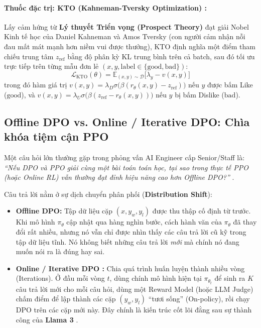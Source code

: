 \paragraph{Thuốc đặc trị: KTO (Kahneman-Tversky Optimization) \citep{ethayarajh2024kto}:}
Lấy cảm hứng từ \textbf{Lý thuyết Triển vọng (Prospect Theory)} đạt giải Nobel Kinh tế học của Daniel Kahneman và Amos Tversky (con người cảm nhận nỗi đau mất mát mạnh hơn niềm vui được thưởng), KTO định nghĩa một điểm tham chiếu trung tâm $z_{\text{ref}}$ bằng độ phân kỳ KL trung bình trên cả batch, sau đó tối ưu trực tiếp trên từng mẫu đơn lẻ $(x, y, \text{label} \in \{\text{good}, \text{bad}\})$:
\begin{equation}
  \mathcal{L}_{\text{KTO}}(\theta) = \mathbb{E}_{(x, y) \sim \mathcal{D}} \Big[ \lambda_y - v(x, y) \Big]
  \label{eq:kto_loss}
\end{equation}
trong đó hàm giá trị $v(x, y) = \lambda_D \sigma\big(\beta (r_\theta(x, y) - z_{\text{ref}})\big)$ nếu $y$ được bấm Like ($\text{good}$), và $v(x, y) = \lambda_U \sigma\big(\beta (z_{\text{ref}} - r_\theta(x, y))\big)$ nếu $y$ bị bấm Dislike ($\text{bad}$).

\subsection{Offline DPO vs. Online / Iterative DPO: Chìa khóa tiệm cận PPO}

Một câu hỏi lớn thường gặp trong phỏng vấn AI Engineer cấp Senior/Staff là: \textit{``Nếu DPO và PPO giải cùng một bài toán toán học, tại sao trong thực tế PPO (hoặc Online RL) vẫn thường đạt đỉnh hiệu năng cao hơn Offline DPO?''} \citep{xiong2024iterative, xu2024dpo}.

Câu trả lời nằm ở sự dịch chuyển phân phối (\textbf{Distribution Shift}):
\begin{itemize}
  \item \textbf{Offline DPO:} Tập dữ liệu cặp $(x, y_w, y_l)$ được thu thập cố định từ trước. Khi mô hình $\pi_\theta$ cập nhật qua hàng nghìn bước, cách hành văn của $\pi_\theta$ đã thay đổi rất nhiều, nhưng nó vẫn chỉ được nhìn thấy các câu trả lời cũ kỹ trong tập dữ liệu tĩnh. Nó không biết những câu trả lời \textit{mới} mà chính nó đang muốn nói ra là đúng hay sai.
  \item \textbf{Online / Iterative DPO \citep{xiong2024iterative}:} Chia quá trình huấn luyện thành nhiều vòng (Iterations). Ở đầu mỗi vòng $t$, dùng chính mô hình hiện tại $\pi_{\theta_t}$ để sinh ra $K$ câu trả lời mới cho mỗi câu hỏi, dùng một Reward Model (hoặc LLM Judge) chấm điểm để lập thành các cặp $(y_w, y_l)$ ``tươi sống'' (On-policy), rồi chạy DPO trên các cặp mới này. Đây chính là kiến trúc cốt lõi đằng sau sự thành công của \textbf{Llama 3} \citep{dubey2024llama}.
\end{itemize}

